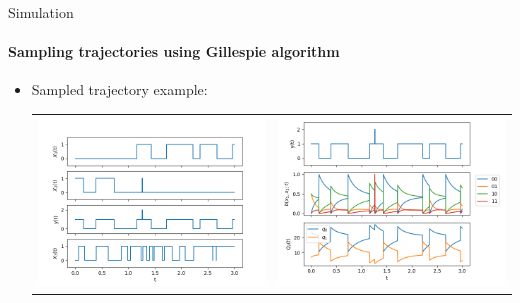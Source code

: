 \documentclass[
	english,%
	aspectratio=169,%
	color={accentcolor=3b},
	logo=true,%
	colorframetitle=false,%
	]{tudabeamer}
\begin{document}
\begin{frame}{Simulation}
\framesubtitle{Sampling trajectories using Gillespie algorithm}
\begin{itemize}
	\item Sampled trajectory example:
	\begin{tabular}{cc}
		\includegraphics[height=0.66\textheight]{figures/trajectory_plot}
		&
		\includegraphics[height=0.6\textheight]{figures/b_Q_plot}
	\end{tabular}
\end{itemize}
\end{frame}
\end{document}
